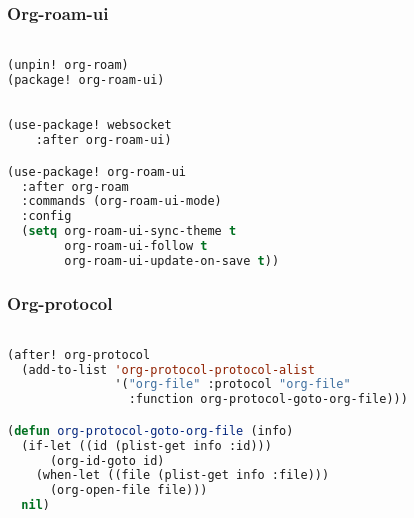 \documentclass[11pt]{article}
\begin{document}
\subsubsection{Org-roam-ui}
\label{sec:org-roam-ui}
\begin{lstlisting}[language=Lisp]%! Someone please complete this list for me

(unpin! org-roam)
(package! org-roam-ui)
\end{lstlisting}

\begin{lstlisting}[language=Lisp]%! Someone please complete this list for me

(use-package! websocket
    :after org-roam-ui)

(use-package! org-roam-ui
  :after org-roam
  :commands (org-roam-ui-mode)
  :config
  (setq org-roam-ui-sync-theme t
        org-roam-ui-follow t
        org-roam-ui-update-on-save t))
\end{lstlisting}

\subsubsection{Org-protocol}
\label{sec:org-protocol}
\begin{lstlisting}[language=Lisp]%! Someone please complete this list for me

(after! org-protocol
  (add-to-list 'org-protocol-protocol-alist
               '("org-file" :protocol "org-file"
                 :function org-protocol-goto-org-file)))

(defun org-protocol-goto-org-file (info)
  (if-let ((id (plist-get info :id)))
      (org-id-goto id)
    (when-let ((file (plist-get info :file)))
      (org-open-file file)))
  nil)
\end{lstlisting}
\end{document}
